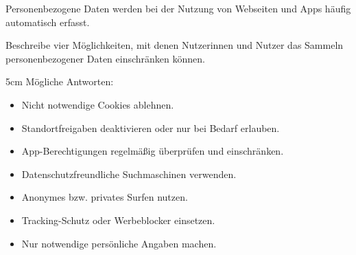 \question[4]
Personenbezogene Daten werden bei der Nutzung von Webseiten und Apps häufig
automatisch erfasst.

Beschreibe vier Möglichkeiten, mit denen Nutzerinnen und Nutzer das Sammeln
personenbezogener Daten einschränken können.

\begin{solutionbox}{5cm}
Mögliche Antworten:
\begin{itemize}
\item Nicht notwendige Cookies ablehnen.
\item Standortfreigaben deaktivieren oder nur bei Bedarf erlauben.
\item App-Berechtigungen regelmäßig überprüfen und einschränken.
\item Datenschutzfreundliche Suchmaschinen verwenden.
\item Anonymes bzw. privates Surfen nutzen.
\item Tracking-Schutz oder Werbeblocker einsetzen.
\item Nur notwendige persönliche Angaben machen.
\end{itemize}
\end{solutionbox}